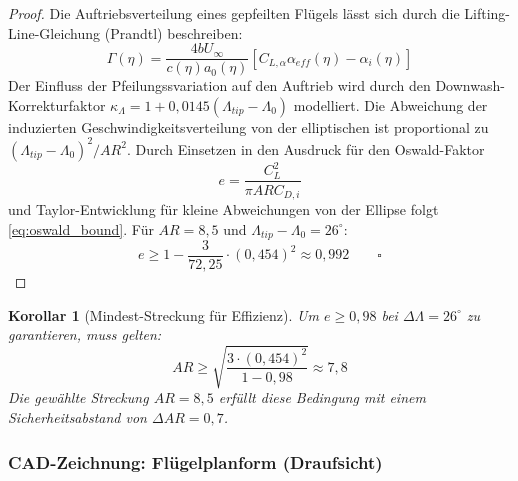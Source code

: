 ﻿\documentclass[12pt,a4paper]{article}
\newtheorem{korollar}[theorem]{Korollar}
\theoremstyle{remark}
\begin{document}
	\begin{proof}
		Die Auftriebsverteilung eines gepfeilten Flügels lässt sich durch die
		Lifting-Line-Gleichung (Prandtl) beschreiben:
		\begin{equation}
			\Gamma(\eta) = \frac{4bU_\infty}{c(\eta) a_0(\eta)}
			\left[C_{L,\alpha} \alpha_{eff}(\eta) - \alpha_{i}(\eta)\right]
		\end{equation}
		Der Einfluss der Pfeilungssvariation auf den Auftrieb wird durch den
		Downwash-Korrektur\-faktor $\kappa_\Lambda = 1 + 0{,}0145(\Lambda_{tip}-\Lambda_0)$
		modelliert. Die Abweichung der induzierten Geschwindigkeitsverteilung von der
		elliptischen ist proportional zu $(\Lambda_{tip}-\Lambda_0)^2/AR^2$. Durch
		Einsetzen in den Ausdruck für den Oswald-Faktor
		\[
		e = \frac{C_L^2}{\pi AR C_{D,i}}
		\]
		und Taylor-Entwicklung für kleine Abweichungen von der Ellipse folgt
		\cref{eq:oswald_bound}. Für $AR = 8{,}5$ und $\Lambda_{tip}-\Lambda_0 = 26^{\circ}$:
		\[
		e \geq 1 - \frac{3}{72{,}25} \cdot (0{,}454)^2 \approx 0{,}992 \qquad\square
		\]
	\end{proof}
	
	\begin{korollar}[Mindest-Streckung für Effizienz]
		\label{cor:ar_min}
		Um $e \geq 0{,}98$ bei $\Delta\Lambda = 26^{\circ}$ zu garantieren, muss gelten:
		\begin{equation}
			AR \geq \sqrt{\frac{3 \cdot (0{,}454)^2}{1 - 0{,}98}} \approx 7{,}8
		\end{equation}
		Die gewählte Streckung $AR = 8{,}5$ erfüllt diese Bedingung mit einem Sicherheitsabstand
		von $\Delta AR = 0{,}7$.
	\end{korollar}
	
	\subsubsection{CAD-Zeichnung: Flügelplanform (Draufsicht)}
	
\end{document}
